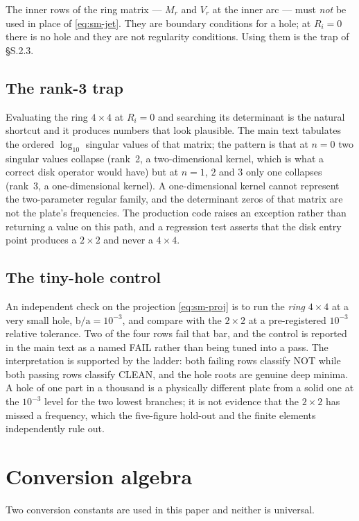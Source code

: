 \documentclass[11pt]{article}
\newcommand{\ba}{\mbox{b/a}}
\begin{document}
The inner rows of the ring matrix --- $M_r$ and $V_r$ at the inner arc --- must
\emph{not} be used in place of \eqref{eq:sm-jet}. They are boundary conditions
for a hole; at $R_i=0$ there is no hole and they are not regularity
conditions. Using them is the trap of \S{}S.2.3.

\subsection{The rank-3 trap}\label{sec:sm-rank}
Evaluating the ring $4\times4$ at $R_i=0$ and searching its determinant is the
natural shortcut and it produces numbers that look plausible. The main text
tabulates the ordered $\log_{10}$ singular values of that matrix; the pattern
is that at $n=0$ two singular values collapse (rank~2, a two-dimensional
kernel, which is what a correct disk operator would have) but at $n=1$, $2$
and $3$ only one collapses (rank~3, a one-dimensional kernel). A
one-dimensional kernel cannot represent the two-parameter regular family, and
the determinant zeros of that matrix are not the plate's frequencies. The
production code raises an exception rather than returning a value on this
path, and a regression test asserts that the disk entry point produces a
$2\times2$ and never a $4\times4$.

\subsection{The tiny-hole control}\label{sec:sm-tiny}
An independent check on the projection \eqref{eq:sm-proj} is to run the
\emph{ring} $4\times4$ at a very small hole, $\ba=10^{-3}$, and compare with
the $2\times2$ at a pre-registered $10^{-3}$ relative tolerance. Two of the
four rows fail that bar, and the control is reported in the main text as a
named FAIL rather than being tuned into a pass. The interpretation is
supported by the ladder: both failing rows classify NOT while both passing
rows classify CLEAN, and the hole roots are genuine deep minima. A hole of
one part in a thousand is a physically different plate from a solid one at
the $10^{-3}$ level for the two lowest branches; it is not evidence that the
$2\times2$ has missed a frequency, which the five-figure hold-out and the
finite elements independently rule out.

\section{Conversion algebra}\label{sec:sm-conv}
Two conversion constants are used in this paper and neither is universal.
\end{document}
